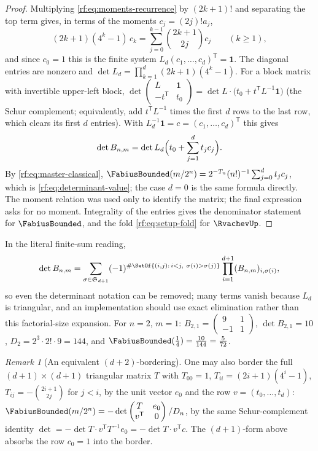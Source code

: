 \documentclass[11pt,oneside]{article}
\theoremstyle{plain}
\theoremstyle{definition}
\theoremstyle{remark}
\newtheorem{remark}[theorem]{Remark}
\newcommand{\Fb}{\FabiusBounded}            %
\newcommand{\up}{\RvachevUp}                %
\newcommand{\Tr}[1]{T_{#1}}                 %
\begin{document}
\begin{proof}
Multiplying \cref{rf:eq:moments-recurrence} by $(2k+1)!$ and separating the
top term gives, in terms of the moments $c_{j}=(2j)!a_{j}$,
\[
 (2k+1)(4^{k}-1)\,c_{k}=\sum_{j=0}^{k-1}\binom{2k+1}{2j}c_{j}\qquad(k\ge1),
\]
and since $c_{0}=1$ this is the finite system
$L_{d}(c_{1},\ldots,c_{d})^{\mathsf T}=\mathbf 1$.  The diagonal entries are
nonzero and $\det L_{d}=\prod_{k=1}^{d}(2k+1)(4^{k}-1)$.  For a block
matrix with invertible upper-left block, $\det\begin{pmatrix}L&\mathbf 1\\-t^{\mathsf T}&t_{0}\end{pmatrix}
=\det L\cdot\bigl(t_{0}+t^{\mathsf T}L^{-1}\mathbf 1\bigr)$ (the Schur
complement; equivalently, add $t^{\mathsf T}L^{-1}$ times the first $d$ rows
to the last row, which clears its first $d$ entries).  With
$L_{d}^{-1}\mathbf 1=c=(c_{1},\ldots,c_{d})^{\mathsf T}$ this gives
\[
 \det B_{n,m}=\det L_{d}\Bigl(t_{0}+\sum_{j=1}^{d}t_{j}c_{j}\Bigr).
\]
By \cref{rf:eq:master-classical}, $\Fb(m/2^{n})=2^{-\Tr{n}}(n!)^{-1}\sum_{j=0}^{d}t_{j}c_{j}$,
which is \cref{rf:eq:determinant-value}; the case $d=0$ is the same formula
directly.  The moment relation was used only to identify the matrix; the
final expression asks for no moment.  Integrality of the entries gives the
denominator statement for $\Fb$, and the fold \cref{rf:eq:setup-fold} for
$\up$.
\end{proof}

In the literal finite-sum reading,
\begin{equation}
 \det B_{n,m}=\sum_{\sigma\in\mathfrak S_{d+1}}
 (-1)^{\#\SetOf{(i,j):\,i<j,\ \sigma(i)>\sigma(j)}}
 \prod_{i=1}^{d+1}(B_{n,m})_{i,\sigma(i)},
 \label{rf:eq:determinant-leibniz}
\end{equation}
so even the determinant notation can be removed; many terms vanish because
$L_{d}$ is triangular, and an implementation should use exact elimination
rather than this factorial-size expansion.  For $n=2$, $m=1$:
$B_{2,1}=\begin{pmatrix}9&1\\-1&1\end{pmatrix}$, $\det B_{2,1}=10$,
$D_{2}=2^{3}\cdot2!\cdot9=144$, and $\Fb(\tfrac14)=\tfrac{10}{144}=\tfrac5{72}$.

\begin{remark}[An equivalent $(d+2)$-bordering]
\label{rf:rmk:determinant-alt}
One may also border the full $(d+1)\times(d+1)$ triangular matrix $T$ with
$T_{00}=1$, $T_{ii}=(2i+1)(4^{i}-1)$, $T_{ij}=-\binom{2i+1}{2j}$ for $j<i$,
by the unit vector $e_{0}$ and the row $v=(t_{0},\ldots,t_{d})$:
$\Fb(m/2^{n})=-\det\begin{pmatrix}T&e_{0}\\ v^{\mathsf T}&0\end{pmatrix}/D_{n}$,
by the same Schur-complement identity
$\det=-\det T\cdot v^{\mathsf T}T^{-1}e_{0}=-\det T\cdot v^{\mathsf T}c$.
The $(d+1)$-form above absorbs the row $c_{0}=1$ into the border.
\end{remark}
\end{document}
